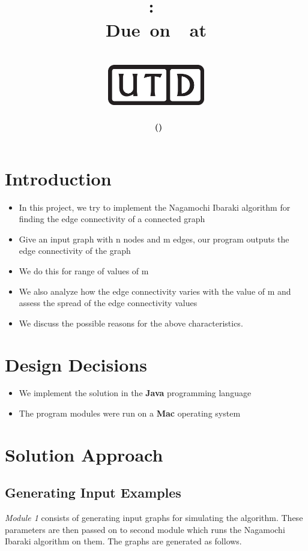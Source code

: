 \documentclass[12pt,letterpaper,titlepage,en-US]{article}
\title{
    \vspace{1in}
    \textmd{\textbf{\hmwkClassName \\\hmwkClass:\ \hmwkTitle }}\\
    \normalsize\vspace{0.1in}\small{Due\ on\ \DTMusedate{DueDate}\ at \DTMusetime{DueDate} }\\
    \vspace{0.1in}\large{\textit{\hmwkClassInstructor}}\\
    \vspace{0.5in}\includegraphics[height=2.4em]{UTD_logo_BW}\\
    \vspace{2in}
}
\author{\textbf{\hmwkAuthorName\ \footnotesize{(\hmwkAuthorNetID)}} \\ }
\date{}
\begin{document}
\maketitle
{}

\tableofcontents

\pagebreak
{}

\section{Introduction}
\begin{itemize}
\item In this project, we try to implement the Nagamochi Ibaraki algorithm for finding the edge connectivity of a connected graph
\item Give an input graph with n nodes and m edges, our program outputs the edge connectivity of the graph
\item We do this for range of values of m
\item  We also analyze how the edge connectivity varies with the value of m and assess the spread of the edge connectivity values
\item We discuss the possible reasons for the above characteristics.
\end{itemize}

\section{Design Decisions}
\begin{itemize}
\item We implement the solution in the \textbf{Java} programming language
\item The program modules were run on a \textbf{Mac} operating system

\end{itemize}





\section{Solution Approach}

\subsection{Generating Input Examples}
\textit{Module 1} consists of generating input graphs for simulating the algorithm.
These parameters are then passed on to second module which runs the Nagamochi Ibaraki  algorithm on them. The graphs are generated as follows.
\end{document}
